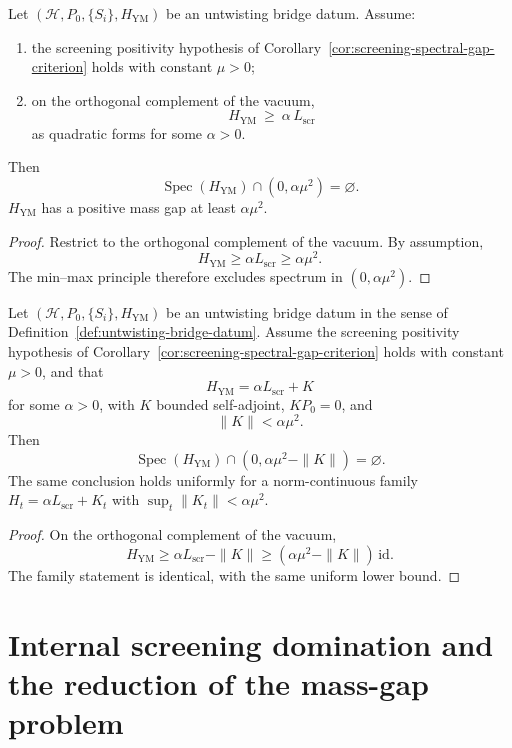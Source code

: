 \begin{theorem}
\label{thm:conditional-mass-gap-transfer}
Let $(\mathcal H,P_0,\{S_i\},H_{\mathrm{YM}})$ be an untwisting bridge datum.
Assume:
\begin{enumerate}[label=(\alph*)]
\item the screening positivity hypothesis of Corollary~\ref{cor:screening-spectral-gap-criterion} holds with constant $\mu>0$;
\item on the orthogonal complement of the vacuum,
\[
H_{\mathrm{YM}}\ \ge\ \alpha\, L_{\mathrm{scr}}
\]
as quadratic forms for some $\alpha>0$.
\end{enumerate}
Then
\[
\operatorname{Spec}(H_{\mathrm{YM}})\cap (0,\alpha\mu^2)=\varnothing.
\]
$H_{\mathrm{YM}}$ has a positive mass gap at least $\alpha\mu^2$.
\end{theorem}

\begin{proof}
Restrict to the orthogonal complement of the vacuum. By assumption,
\[
H_{\mathrm{YM}}\ge \alpha L_{\mathrm{scr}} \ge \alpha\mu^2.
\]
The min--max principle therefore excludes spectrum in $(0,\alpha\mu^2)$.
\end{proof}

\begin{corollary}
\label{cor:stable-untwisting-bounded-error}
Let $(\mathcal H,P_0,\{S_i\},H_{\mathrm{YM}})$ be an untwisting bridge
datum in the sense of Definition~\ref{def:untwisting-bridge-datum}.
Assume the screening positivity hypothesis of
Corollary~\ref{cor:screening-spectral-gap-criterion} holds with
constant $\mu>0$, and that
\[
H_{\mathrm{YM}} = \alpha L_{\mathrm{scr}} + K
\]
for some $\alpha>0$, with $K$ bounded self-adjoint, $KP_0=0$, and
\[
\|K\|<\alpha\mu^2.
\]
Then
\[
\operatorname{Spec}(H_{\mathrm{YM}})\cap (0,\alpha\mu^2-\|K\|)=\varnothing.
\]
The same conclusion holds uniformly for a norm-continuous family $H_t=\alpha L_{\mathrm{scr}}+K_t$ with
$\sup_t\|K_t\|<\alpha\mu^2$.
\end{corollary}

\begin{proof}
On the orthogonal complement of the vacuum,
\[
H_{\mathrm{YM}}\ge \alpha L_{\mathrm{scr}}-\|K\| \ge (\alpha\mu^2-\|K\|)\,\mathrm{id}.
\]
The family statement is identical, with the same uniform lower bound.
\end{proof}


\section{Internal screening domination and the reduction of the mass-gap problem}
\label{sec:internal-screening-domination-reduction}

